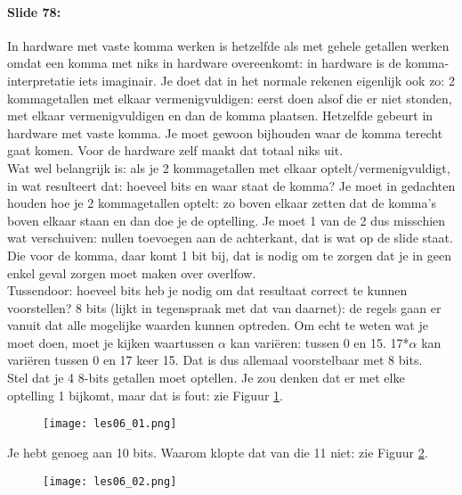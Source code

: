 \documentclass[10pt,a4paper]{book}
\begin{document}
\paragraph{Slide 78:} In hardware met vaste komma werken is hetzelfde als met gehele getallen werken omdat een komma met niks in hardware overeenkomt: in hardware is de komma-interpretatie iets imaginair. Je doet dat in het normale rekenen eigenlijk ook zo: 2 kommagetallen met elkaar vermenigvuldigen: eerst doen alsof die er niet stonden, met elkaar vermenigvuldigen en dan de komma plaatsen. Hetzelfde gebeurt in hardware met vaste komma. Je moet gewoon bijhouden waar de komma terecht gaat komen. Voor de hardware zelf maakt dat totaal niks uit.\\
Wat wel belangrijk is: als je 2 kommagetallen met elkaar optelt/vermenigvuldigt, in wat resulteert dat: hoeveel bits en waar staat de komma? Je moet in gedachten houden hoe je 2 kommagetallen optelt: zo boven elkaar zetten dat de komma's boven elkaar staan en dan doe je de optelling. Je moet 1 van de 2 dus misschien wat verschuiven: nullen toevoegen aan de achterkant, dat is wat op de slide staat. Die voor de komma, daar komt 1 bit bij, dat is nodig om te zorgen dat je in geen enkel geval zorgen moet maken over overlfow.\\
Tussendoor: hoeveel bits heb je nodig om dat resultaat correct te kunnen voorstellen? 8 bits (lijkt in tegenspraak met dat van daarnet): de regels gaan er vanuit dat alle mogelijke waarden kunnen optreden. Om echt te weten wat je moet doen, moet je kijken waartussen $\alpha$ kan vari\"eren: tussen 0 en 15. 17*$\alpha$ kan vari\"eren tussen 0 en 17 keer 15. Dat is dus allemaal voorstelbaar met 8 bits.\\
Stel dat je 4 8-bits getallen moet optellen. Je zou denken dat er met elke optelling 1 bijkomt, maar dat is fout: zie Figuur \ref{les06_01}.

\begin{figure}[ht!]
\centering
\texttt{[image: les06\_01.png]}
\label{les06_01}
\end{figure}

Je hebt genoeg aan 10 bits. Waarom klopte dat van die 11 niet: zie Figuur \ref{les06_02}.

\begin{figure}[ht!]
\centering
\texttt{[image: les06\_02.png]}
\label{les06_02}
\end{figure}
\end{document}
